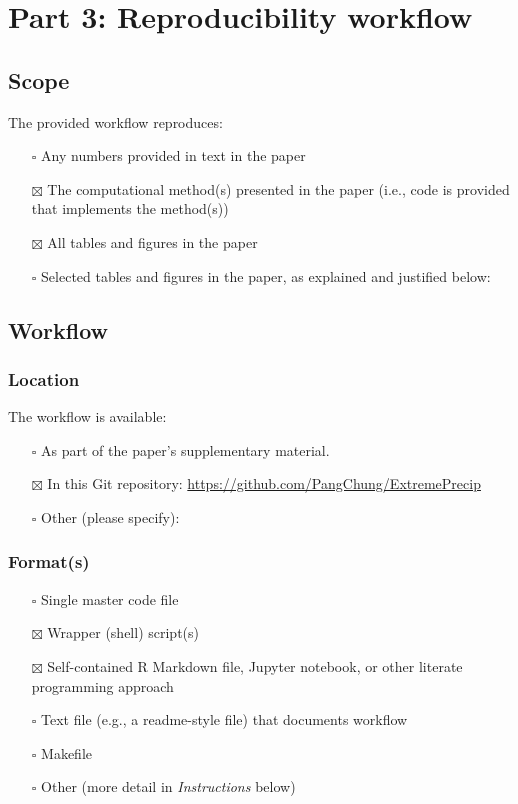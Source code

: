 \documentclass[
]{article}
\providecommand{\tightlist}{%
  \setlength{\itemsep}{0pt}\setlength{\parskip}{0pt}}
\begin{document}
\section{Part 3: Reproducibility
workflow}\label{part-3-reproducibility-workflow}

\subsection{Scope}\label{scope}

The provided workflow reproduces:

\begin{itemize}
\tightlist
\item[$\square$]
  Any numbers provided in text in the paper
\item[$\boxtimes$]
  The computational method(s) presented in the paper (i.e., code is
  provided that implements the method(s))
\item[$\boxtimes$]
  All tables and figures in the paper
\item[$\square$]
  Selected tables and figures in the paper, as explained and justified
  below:
\end{itemize}

\subsection{Workflow}\label{workflow}

\subsubsection{Location}\label{location}

The workflow is available:

\begin{itemize}
\tightlist
\item[$\square$]
  As part of the paper's supplementary material.
\item[$\boxtimes$]
  In this Git repository:
  \url{https://github.com/PangChung/ExtremePrecip}
\item[$\square$]
  Other (please specify):
\end{itemize}

\subsubsection{Format(s)}\label{formats}

\begin{itemize}
\tightlist
\item[$\square$]
  Single master code file
\item[$\boxtimes$]
  Wrapper (shell) script(s)
\item[$\boxtimes$]
  Self-contained R Markdown file, Jupyter notebook, or other literate
  programming approach
\item[$\square$]
  Text file (e.g., a readme-style file) that documents workflow
\item[$\square$]
  Makefile
\item[$\square$]
  Other (more detail in \emph{Instructions} below)
\end{itemize}
\end{document}
